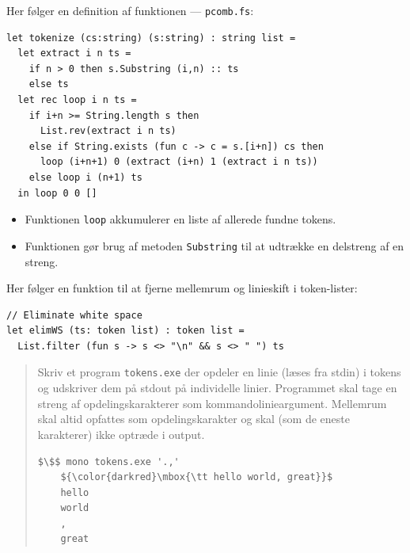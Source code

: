 \documentclass[rgb]{beamer}
\begin{document}
\begin{frame}[fragile]
\begin{footnotesize}


  Her følger en definition af funktionen  --- \lstinline{pcomb.fs}:

  \vspace{1ex}

\begin{lstlisting}[numbers=none,frame=none,mathescape]
let tokenize (cs:string) (s:string) : string list =
  let extract i n ts =
    if n > 0 then s.Substring (i,n) :: ts
    else ts
  let rec loop i n ts =
    if i+n >= String.length s then
      List.rev(extract i n ts)
    else if String.exists (fun c -> c = s.[i+n]) cs then
      loop (i+n+1) 0 (extract (i+n) 1 (extract i n ts))
    else loop i (n+1) ts
  in loop 0 0 []
\end{lstlisting}


\begin{itemize}
\item Funktionen \lstinline{loop} akkumulerer en liste af allerede fundne tokens.
\item Funktionen gør brug af metoden \lstinline{Substring} til at udtrække en delstreng af en streng.
\end{itemize}

\end{footnotesize}
\end{frame}

\begin{frame}[fragile]
\begin{footnotesize}


  Her følger en funktion til at fjerne mellemrum og linieskift i
  token-lister:

\begin{lstlisting}[numbers=none,frame=none,mathescape]
// Eliminate white space
let elimWS (ts: token list) : token list =
  List.filter (fun s -> s <> "\n" && s <> " ") ts
\end{lstlisting}


\begin{quote}
  Skriv et program \lstinline{tokens.exe} der opdeler en linie (læses
  fra stdin) i tokens og udskriver dem på stdout på individelle
  linier. Programmet skal tage en streng af opdelingskarakterer som
  kommandolinieargument. Mellemrum skal altid opfattes som
  opdelingskarakter og skal (som de eneste karakterer) ikke optræde i
  output.

  \begin{lstlisting}[numbers=none,frame=none,mathescape]
    $\$$ mono tokens.exe '.,'
    ${\color{darkred}\mbox{\tt hello world, great}}$
    hello
    world
    ,
    great
  \end{lstlisting}
\end{quote}
\end{footnotesize}
\end{frame}
\end{document}
